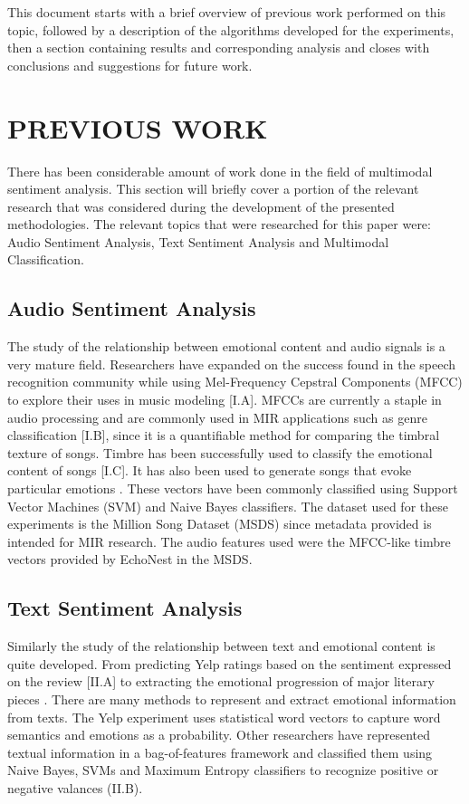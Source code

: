  This document starts with a brief overview of previous work performed on this 
 topic, followed by a description of the algorithms developed for the experiments, 
 then a section containing results and corresponding analysis and closes 
 with conclusions and suggestions for future work.
 
 \chapter{PREVIOUS WORK}

There has been considerable amount of work done in the field of multimodal 
sentiment analysis. This section will briefly cover a portion of the relevant 
research that was considered during the development of the presented 
methodologies. The relevant topics that were researched for this paper were: Audio Sentiment 
Analysis, Text Sentiment Analysis and Multimodal Classification.


\section{Audio Sentiment Analysis}

The study of the relationship between emotional content and audio signals is a 
very mature field. Researchers have expanded on the success found in the 
speech recognition community while using Mel-Frequency Cepstral Components 
(MFCC) to explore their uses in music modeling [I.A]. MFCCs are currently a 
staple in audio processing and are commonly used in MIR applications such 
as genre classification [I.B], since it is a quantifiable method for comparing the 
timbral texture of songs. Timbre has been successfully used to classify the 
emotional content of songs [I.C]. It has also been used to generate 
songs that evoke particular emotions \cite{transprose}.  These vectors have been commonly 
classified using Support Vector Machines (SVM) and Naive Bayes classifiers. The 
dataset used for these experiments is the Million Song Dataset (MSDS) \cite{Bertin-Mahieux2011} 
since metadata provided is intended for MIR research. The audio features 
used were the MFCC-like timbre vectors provided by EchoNest in the MSDS. 

\section{Text Sentiment Analysis}

Similarly the study of the relationship between text and emotional content is quite 
developed. From predicting Yelp ratings based on the sentiment expressed on the 
review [II.A]  to extracting the emotional progression of major literary pieces \cite{transprose}.  
There are many methods to represent and extract emotional information from texts. 
The Yelp experiment uses statistical word vectors to capture word semantics and 
emotions as a probability.  Other researchers have represented textual information in 
a bag-of-features framework and classified them using Naive Bayes, SVMs and 
Maximum Entropy classifiers to recognize positive or negative valances (II.B).  

